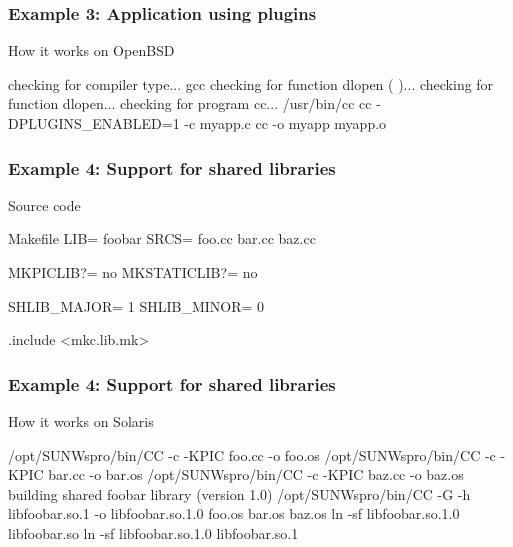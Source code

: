 \documentclass[hyperref={colorlinks=true}]{beamer}
\begin{document}
\begin{frame}[fragile]
  \frametitle{Example 3: Application using plugins}

  \begin{block}{How it works on OpenBSD}
\begin{CodeNoLabel}
checking for compiler type... gcc
checking for function dlopen (  )... 
checking for function dlopen... 
checking for program cc... /usr/bin/cc
cc  -DPLUGINS_ENABLED=1    -c myapp.c
cc   -o myapp myapp.o
\prompt{\$}
\end{CodeNoLabel}
  \end{block}
\end{frame}

\begin{frame}[fragile]
  \frametitle{Example 4: Support for shared libraries}

  \begin{block}{Source code}
  \begin{Code}{Makefile}
LIB=                   foobar
SRCS=                  foo.cc bar.cc baz.cc

MKPICLIB?=             no
MKSTATICLIB?=          no

SHLIB_MAJOR=           1
SHLIB_MINOR=           0

.include <mkc.lib.mk>
  \end{Code}
  \end{block}
\end{frame}

\begin{frame}[fragile]
  \frametitle{Example 4: Support for shared libraries}

  \begin{block}{How it works on Solaris}
\begin{CodeNoLabel}
/opt/SUNWspro/bin/CC    -c -KPIC foo.cc -o foo.os
/opt/SUNWspro/bin/CC    -c -KPIC bar.cc -o bar.os
/opt/SUNWspro/bin/CC    -c -KPIC baz.cc -o baz.os
building shared foobar library (version 1.0)
/opt/SUNWspro/bin/CC -G -h libfoobar.so.1 
   -o libfoobar.so.1.0  foo.os bar.os baz.os
ln -sf libfoobar.so.1.0 libfoobar.so
ln -sf libfoobar.so.1.0 libfoobar.so.1
\prompt{\$}
\end{CodeNoLabel}
  \end{block}
\end{frame}
\end{document}
